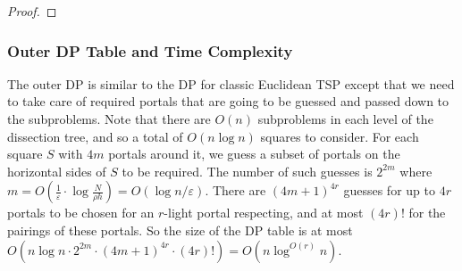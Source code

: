 \documentclass[pdflatex,sn-mathphys-num]{sn-jnl}
\theoremstyle{thmstyleone}
\newcommand{\eps}{\varepsilon}
\newcommand{\opt}{{\text{opt}}}
\begin{document}
\begin{proof}

\end{proof}

\subsubsection*{Outer DP Table and Time Complexity} 

The outer DP is similar to the DP for classic Euclidean TSP except that we need to
take care of required portals that are going to be guessed and passed down to the subproblems.
Note that there are $O(n)$ subproblems in each level of the dissection tree, and so a total of $O(n\log n)$
squares to consider.
For each square $S$ with $4m$ portals around it, we guess a subset of portals on the horizontal sides of $S$
to be required. The number of such guesses is $2^{2m}$ where $m=O(\frac{1}{\eps}\cdot\log\frac{N}{\rho h})=O(\log n/\eps)$.
There are $(4m+1)^{4r}$ guesses for up to $4r$ portals to be chosen for an $r$-light portal respecting, and
at most $(4r)!$ for the pairings of these portals.
So the size of the DP table  is at most $O(n\log n\cdot 2^{2m}\cdot (4m+1)^{4r}\cdot (4r)!)=O(n\log^{O(r)} n)$.
\end{document}
